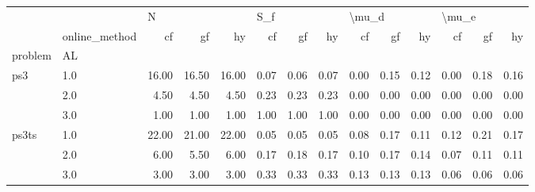 \begin{tabular}{llrrrrrrrrrrrr}
\toprule
      & {} & \multicolumn{3}{l}{N} & \multicolumn{3}{l}{S\_f} & \multicolumn{3}{l}{\textbackslash mu\_d} & \multicolumn{3}{l}{\textbackslash mu\_e} \\
      & online\_method &    cf &    gf &    hy &   cf &   gf &   hy &    cf &   gf &   hy &    cf &   gf &   hy \\
problem & AL &       &       &       &      &      &      &       &      &      &       &      &      \\
\midrule
ps3 & 1.0 & 16.00 & 16.50 & 16.00 & 0.07 & 0.06 & 0.07 &  0.00 & 0.15 & 0.12 &  0.00 & 0.18 & 0.16 \\
      & 2.0 &  4.50 &  4.50 &  4.50 & 0.23 & 0.23 & 0.23 &  0.00 & 0.00 & 0.00 &  0.00 & 0.00 & 0.00 \\
      & 3.0 &  1.00 &  1.00 &  1.00 & 1.00 & 1.00 & 1.00 &  0.00 & 0.00 & 0.00 &  0.00 & 0.00 & 0.00 \\
ps3ts & 1.0 & 22.00 & 21.00 & 22.00 & 0.05 & 0.05 & 0.05 &  0.08 & 0.17 & 0.11 &  0.12 & 0.21 & 0.17 \\
      & 2.0 &  6.00 &  5.50 &  6.00 & 0.17 & 0.18 & 0.17 &  0.10 & 0.17 & 0.14 &  0.07 & 0.11 & 0.11 \\
      & 3.0 &  3.00 &  3.00 &  3.00 & 0.33 & 0.33 & 0.33 &  0.13 & 0.13 & 0.13 &  0.06 & 0.06 & 0.06 \\
\bottomrule
\end{tabular}
